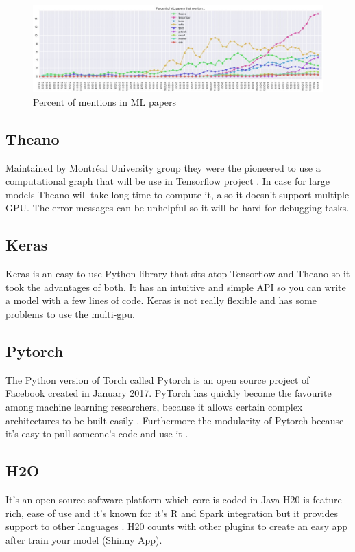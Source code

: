\begin{figure}[H]
\centering
\includegraphics[width=1\textwidth]{./figures/libraries}
\caption{Percent of mentions in ML papers \cite{ml-mentions-image}}
\label{fig:mentionsframeworks}
\end{figure}


\subsection[Theano]{Theano}
Maintained by Montréal University group \cite{specificcomparaison} they were the pioneered to use a computational graph that will be use in Tensorflow project \cite{generalcomparaison}. In case for large models Theano will take long time to compute it, also it doesn't support multiple GPU. The error messages can be unhelpful so it will be hard for debugging tasks.

\subsection[Keras]{Keras}
Keras is an easy-to-use Python library \cite{specificcomparaison}
that sits atop Tensorflow and Theano so it took the advantages of both. It has an intuitive and simple API so you can write a model with a few lines of code. Keras is not really flexible and has some problems to use the multi-gpu. 

\subsection[Pytorch]{Pytorch}
The Python version of Torch called Pytorch is an open source project of Facebook created in January 2017. PyTorch has quickly become the favourite among machine learning researchers, because it allows certain complex architectures to be built easily  \cite{generalcomparaison}. Furthermore the modularity of Pytorch because it's easy to pull someone's code and use it \cite{specificcomparaison}. 

\subsection[H20]{H2O}
It's an open source software platform which core is coded in Java \cite{h20-deeplearning}
H20 is feature rich, ease of use and it's known for it's R and Spark integration but it provides support to other languages \cite{h20-comparative-table}.
H20 counts with other plugins to create an easy app after train your model (Shinny App).
 
